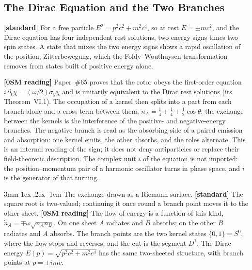 \documentclass[%
 reprint, amsmath,amssymb, aps, prb, ]{revtex4-2}
\makeatletter
\numberwithin{equation}{section}
\renewcommand\paragraph{%
  \@startsection{paragraph}{4}{\z@}%
    {3mm \@plus 1ex \@minus .2ex}%
    {-1em}%
    {\normalfont\normalsize\itshape}}
\newcommand{\iphase}{\theta}
\makeatother
\begin{document}
\subsection{The Dirac Equation and the Two Branches}
\label{subsec:g_dirac}

\textbf{[standard]} For a free particle $E^{2} = p^{2}c^{2} + m^{2}c^{4}$, so at rest $E = \pm mc^{2}$, and the Dirac equation has four independent rest solutions, two energy signs times two spin states. A state that mixes the two energy signs shows a rapid oscillation of the position, Zitterbewegung, which the Foldy--Wouthuysen transformation removes from states built of positive energy alone.

\textbf{[0SM reading]} Paper~\#65 proves that the rotor obeys the first-order equation $i\,\partial_t\chi = (\omega/2)\sigma_y\chi$ and is unitarily equivalent to the Dirac rest solutions (its Theorem~VI.1). The occupation of a kernel then splits into a part from each branch alone and a cross term between them, $n_A = \tfrac14 + \tfrac14 + \tfrac12\cos\iphase$: the exchange between the kernels is the interference of the positive- and negative-energy branches. The negative branch is read as the absorbing side of a paired emission and absorption: one kernel emits, the other absorbs, and the roles alternate. This is an internal reading of the sign; it does not deny antiparticles or replace their field-theoretic description. The complex unit $i$ of the equation is not imported: the position--momentum pair of a harmonic oscillator turns in phase space, and $i$ is the generator of that turning.

\paragraph{The exchange drawn as a Riemann surface.} \textbf{[standard]} The square root is two-valued; continuing it once round a branch point moves it to the other sheet. \textbf{[0SM reading]} The flow of energy is a function of this kind, $\dot n_A = \mp\omega\sqrt{n_An_B}$. On one sheet $A$ radiates and $B$ absorbs; on the other $B$ radiates and $A$ absorbs. The branch points are the two kernel states $\{0,1\} = S^{0}$, where the flow stops and reverses, and the cut is the segment $D^{1}$. The Dirac energy $E(p) = \sqrt{p^{2}c^{2} + m^{2}c^{4}}$ has the same two-sheeted structure, with branch points at $p = \pm imc$.
\end{document}
